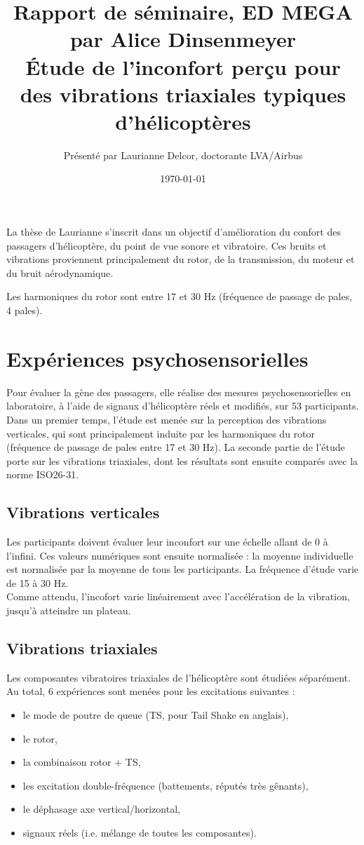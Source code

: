 \documentclass[12pt]{article}
\title{ {\fontsize{14pt}{14pt}\selectfont Rapport de séminaire, ED MEGA par Alice Dinsenmeyer} \\[1cm]
\fontsize{18pt}{18pt}\selectfont\textbf{Étude de l’inconfort perçu pour des vibrations triaxiales typiques d’hélicoptères}} %
\author{
\large{Présenté par Laurianne Delcor, doctorante LVA/Airbus}\\%
\vspace{-5mm}
}
\date{\today}
\begin{document}
\maketitle

La thèse de Laurianne s'inscrit dans un objectif d'amélioration du confort des passagers d'hélicoptère, du point de vue sonore et vibratoire. Ces bruits et vibrations proviennent principalement du rotor, de la transmission, du moteur et du bruit aérodynamique.

Les harmoniques du rotor sont entre 17 et 30 Hz (fréquence de passage de pales, 4 pales).


\section{Expériences psychosensorielles}
 Pour évaluer la gène des passagers, elle réalise des mesures psychosensorielles en laboratoire, à l'aide de signaux d'hélicoptère réels et modifiés, sur 53 participants.\\
 Dans un premier temps, l'étude est menée sur la perception des vibrations verticales, qui sont principalement induite par les harmoniques du rotor (fréquence de passage de pales entre 17 et 30 Hz). La seconde partie de l'étude porte sur les vibrations triaxiales, dont les résultats sont ensuite comparés avec la norme ISO26-31.
 
\subsection{Vibrations verticales}

Les participants doivent évaluer leur inconfort sur une échelle allant de 0 à l'infini. Ces valeurs numériques sont ensuite normalisée : la moyenne individuelle est normalisée par la moyenne de tous les participants. La fréquence d'étude varie de 15 à 30 Hz.\\
Comme attendu, l'incofort varie linéairement avec l'accélération de la vibration, jusqu'à atteindre un plateau.


\subsection{Vibrations triaxiales}
Les composantes vibratoires triaxiales de l’hélicoptère sont étudiées séparément. Au total, 6 expériences sont menées pour les excitations suivantes : 
\begin{itemize}
        \item le mode de poutre de queue (TS, pour Tail Shake en anglais),
        \item le rotor,
        \item la combinaison rotor + TS,
        \item les excitation double-fréquence (battements, réputés très gênants),
        \item le  déphasage axe vertical/horizontal,
        \item signaux réels (i.e. mélange de toutes les composantes).
\end{itemize}
\end{document}
